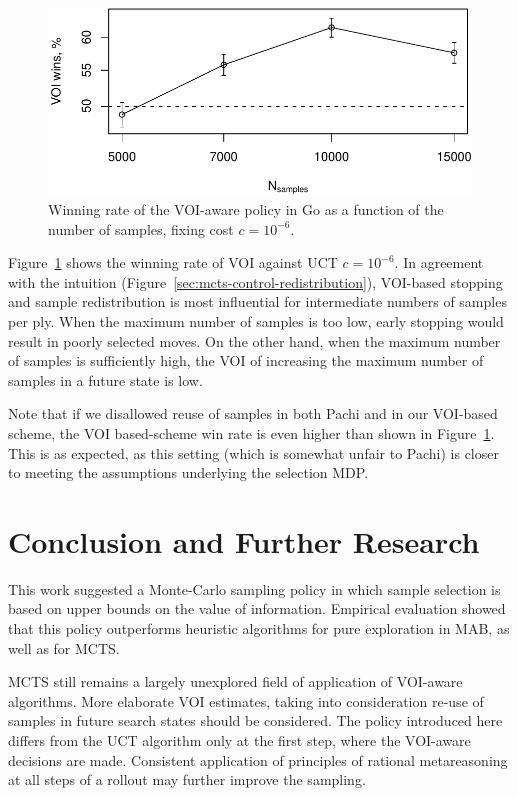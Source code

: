 \begin{figure}[h!]
\centering
\includegraphics[scale=0.55]{mcts-voi-wins.pdf}
\caption{Winning rate of the VOI-aware policy in Go as a function of the number of samples, fixing cost $c=10^{-6}$.}
\label{fig:voi-wins}
\end{figure}

Figure~\ref{fig:voi-wins}
shows the winning rate of VOI against UCT $c=10^{-6}$. In agreement with the intuition
(Figure~\ref{sec:mcts-control-redistribution}), VOI-based stopping and
sample redistribution is most influential for intermediate numbers of
samples per ply. When the maximum number of samples is too low, early
stopping would result in poorly selected moves. On the other hand,
when the maximum number of samples is sufficiently high, the VOI of
increasing the maximum number of samples in a future state is low.

Note that if we disallowed reuse of samples in both Pachi and
in our VOI-based scheme, the VOI based-scheme
win rate is even higher than shown in Figure~\ref{fig:voi-wins}. This is as expected,
as this setting (which is somewhat unfair to Pachi) is closer to
meeting the assumptions underlying the selection MDP.

\section{Conclusion and Further Research}

This work suggested a Monte-Carlo sampling policy in which sample
selection is based on upper bounds on the value of
information. Empirical evaluation showed that this policy outperforms
heuristic algorithms for pure exploration in MAB, as well as for MCTS.

MCTS still remains a largely unexplored field of
application of VOI-aware algorithms. More elaborate VOI estimates,
taking into consideration re-use of samples in future search states
should be considered. The policy introduced here differs from
the UCT algorithm only at the first step, where the VOI-aware
decisions are made. Consistent application of principles of rational
metareasoning at all steps of a rollout may further improve the
sampling.

